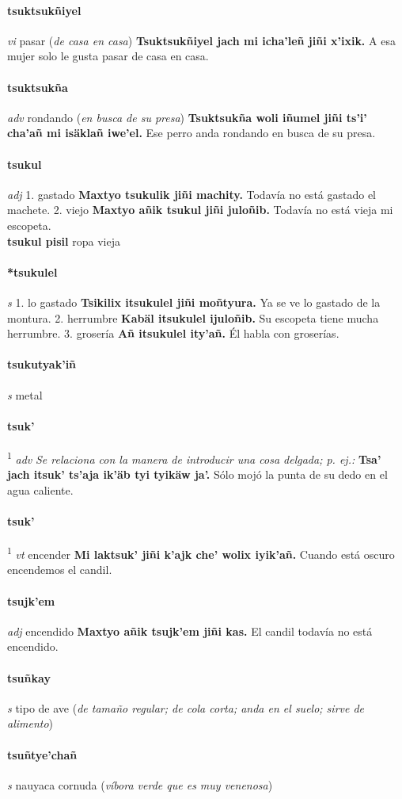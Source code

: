 \documentclass{scrbook}
\newcommand{\entry}[1]{\paragraph{#1}}
\newcommand{\onedefinition}[1]{#1.}
\newcommand{\defsuperscript}[1]{\textsuperscript{1}}
\newcommand{\nontranslationdef}[1]{\textit{#1}}
\newcommand{\partofspeech}[1]{\textit{#1}}
\newcommand{\spanishtranslation}[1]{#1}
\newcommand{\clarification}[1]{(\textit{#1})}
\newcommand{\cholexample}[1]{\textbf{#1}}
\newcommand{\exampletranslation}[1]{#1}
\newcommand{\secondaryentry}[1]{\\\textbf{#1}}
\newcommand{\secondtranslation}[1]{#1}
\begin{document}
\begin{multicols}{2}
\entry{tsuktsukñiyel}
\partofspeech{vi}
\spanishtranslation{pasar}
\clarification{de casa en casa}
\cholexample{Tsuktsukñiyel jach mi icha'leñ jiñi x'ixik.}
\exampletranslation{A esa mujer solo le gusta pasar de casa en casa.}

\entry{tsuktsukña}
\partofspeech{adv}
\spanishtranslation{rondando}
\clarification{en busca de su presa}
\cholexample{Tsuktsukña woli iñumel jiñi ts'i' cha'añ mi isäklañ iwe'el.}
\exampletranslation{Ese perro anda rondando en busca de su presa.}

\entry{tsukul}
\partofspeech{adj}
\onedefinition{1}
\spanishtranslation{gastado}
\cholexample{Maxtyo tsukulik jiñi machity.}
\exampletranslation{Todavía no está gastado el machete.}
\onedefinition{2}
\spanishtranslation{viejo}
\cholexample{Maxtyo añik tsukul jiñi juloñib.}
\exampletranslation{Todavía no está vieja mi escopeta.}
\secondaryentry{tsukul pisil}
\secondtranslation{ropa vieja}

\entry{*tsukulel}
\partofspeech{s}
\onedefinition{1}
\spanishtranslation{lo gastado}
\cholexample{Tsikilix itsukulel jiñi moñtyura.}
\exampletranslation{Ya se ve lo gastado de la montura.}
\onedefinition{2}
\spanishtranslation{herrumbre}
\cholexample{Kabäl itsukulel ijuloñib.}
\exampletranslation{Su escopeta tiene mucha herrumbre.}
\onedefinition{3}
\spanishtranslation{grosería}
\cholexample{Añ itsukulel ity'añ.}
\exampletranslation{Él habla con groserías.}

\entry{tsukutyak'iñ}
\partofspeech{s}
\spanishtranslation{metal}

\entry{tsuk'}
\defsuperscript{1}
\partofspeech{adv}
\nontranslationdef{Se relaciona con la manera de introducir una cosa delgada; p. ej.:}
\cholexample{Tsa' jach itsuk' ts'aja ik'äb tyi tyikäw ja'.}
\exampletranslation{Sólo mojó la punta de su dedo en el agua caliente.}

\entry{tsuk'}
\defsuperscript{2}
\partofspeech{vt}
\spanishtranslation{encender}
\cholexample{Mi laktsuk' jiñi k'ajk che' wolix iyik'añ.}
\exampletranslation{Cuando está oscuro encendemos el candil.}

\entry{tsujk'em}
\partofspeech{adj}
\spanishtranslation{encendido}
\cholexample{Maxtyo añik tsujk'em jiñi kas.}
\exampletranslation{El candil todavía no está encendido.}

\entry{tsuñkay}
\partofspeech{s}
\spanishtranslation{tipo de ave}
\clarification{de tamaño regular; de cola corta; anda en el suelo; sirve de alimento}

\entry{tsuñtye'chañ}
\partofspeech{s}
\spanishtranslation{nauyaca cornuda}
\clarification{víbora verde que es muy venenosa}


\end{multicols}
\end{document}
